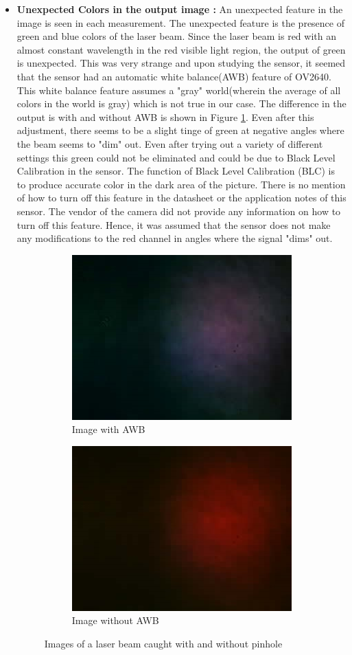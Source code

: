 \begin{itemize}
\item \textbf{Unexpected Colors in the output image :} An unexpected feature in the image is seen in each measurement. The unexpected feature is the presence of green and blue colors of the laser beam. Since the laser beam is red with an almost constant wavelength in the red visible light region, the output of green is unexpected. This was very strange and upon studying the sensor, it seemed that the sensor had an automatic white balance(AWB) feature of OV2640. This white balance feature assumes a "gray" world(wherein the average of all colors in the world is gray)\cite{OV2640SoftwareApp} which is not true in our case. The difference in the output is with and without AWB is shown in Figure \ref{fig:AWB}. Even after this adjustment, there seems to be a slight tinge of green at negative angles where the beam seems to "dim" out. Even after trying out a variety of different settings this green could not be eliminated and could be due to Black Level Calibration in the sensor. The function of Black Level Calibration (BLC) is to produce accurate color in the dark area of the picture. There is no mention of how to turn off this feature in the datasheet or the application notes of this sensor. The vendor of the camera did not provide any information on how to turn off this feature. Hence, it was assumed that the sensor does not make any modifications to the red channel in angles where the signal "dims" out.
\begin{figure}[ht]
    \begin{subfigure}{0.5\textwidth}
    \centering
        \includegraphics[width=0.5\linewidth]{pics/awb.jpg}
        \caption{Image with AWB}
    \end{subfigure}%
    \begin{subfigure}{0.5\textwidth}
    \centering
        \includegraphics[width=0.5\linewidth]{pics/withoutawb.jpg}
        \caption{Image without AWB}
    \end{subfigure}
    \caption{Images of a laser beam caught with and without pinhole}
    \label{fig:AWB}
    \end{figure}
\end{itemize}
